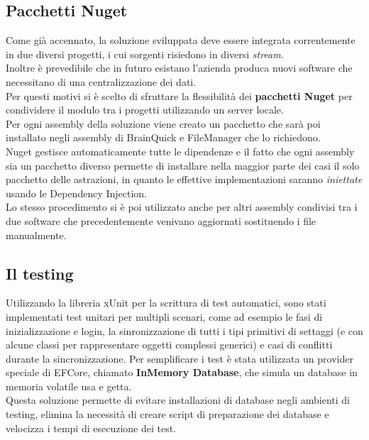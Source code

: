 \documentclass[\main/tesi.tex]{subfiles}
\begin{document}
\subsection{Pacchetti Nuget}
\label{nuget}
Come già accennato, la soluzione sviluppata deve essere integrata correntemente in due diversi progetti, i cui sorgenti risiedono in diversi \textit{stream}.\\
Inoltre è prevedibile che in futuro esistano l'azienda produca nuovi software che necessitano di una centralizzazione dei dati.\\
Per questi motivi si è scelto di sfruttare la flessibilità dei \textbf{pacchetti Nuget} per condividere il modulo tra i progetti utilizzando un server locale.\\
Per ogni assembly della soluzione viene creato un pacchetto che sarà poi installato negli assembly di BrainQuick e FileManager che lo richiedono.\\
Nuget gestisce automaticamente tutte le dipendenze e il fatto che ogni assembly sia un pacchetto diverso permette di installare nella maggior parte dei casi il solo pacchetto delle astrazioni, in quanto le effettive implementazioni saranno \textit{iniettate} usando le Dependency Injection.\\
Lo stesso procedimento si è poi utilizzato anche per altri assembly condivisi tra i due software che precedentemente venivano aggiornati sostituendo i file manualmente.

\subsection{Il testing}
Utilizzando la libreria xUnit per la scrittura di test automatici, sono stati implementati test unitari per multipli scenari, come ad esempio le fasi di inizializzazione e login, la sinronizzazione di tutti i tipi primitivi di settaggi (e con alcune classi per rappresentare oggetti complessi generici) e casi di conflitti durante la sincronizzazione.
Per semplificare i test è stata utilizzata un provider speciale di EFCore, chiamato \textbf{InMemory Database}, che simula un database in memoria volatile usa e getta.\\
Questa soluzione permette di evitare installazioni di database negli ambienti di testing, elimina la necessità di creare script di preparazione dei database e velocizza i tempi di esecuzione dei test.
\end{document}
